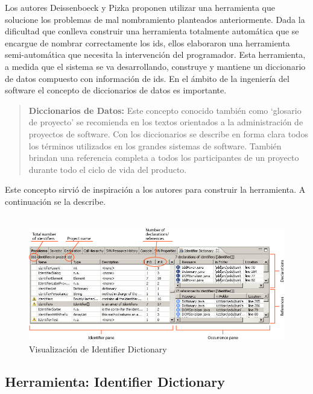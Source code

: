 \documentclass[a4paper,12pt]{report}
\begin{document}
Los autores Deissenboeck y Pizka \cite{DFPM05} proponen utilizar una herramienta que solucione los problemas de mal nombramiento planteados anteriormente. Dada la dificultad que conlleva construir una herramienta totalmente automática que se encargue de nombrar correctamente los ids, ellos elaboraron una herramienta semi-automática que necesita la intervención del programador. Esta herramienta, a medida que el sistema se va desarrollando, construye y mantiene un diccionario de datos compuesto con información de ids. En el ámbito de la ingeniería del software el concepto de diccionarios de datos es importante.


\begin{verse}
\textbf{Diccionarios de Datos:} Este concepto conocido también como `glosario de proyecto' se recomienda en los textos orientados a la administración de proyectos de software. Con los diccionarios se describe en forma clara todos los términos utilizados en los grandes sistemas de software. También brindan una referencia completa a todos los participantes de un proyecto durante todo el ciclo de vida del producto.
\end{verse}

Este concepto sirvió de inspiración a los autores para construir la herramienta. A continuación se la describe. \\ \\

\begin{figure}[h] %
\centerline{%
\includegraphics[scale= 0.55]{./idd_2.png}
}
\caption{Visualización de Identifier Dictionary}
\label{captura3}
\end{figure}
\pagebreak
\subsection{Herramienta: Identifier Dictionary}
\end{document}
